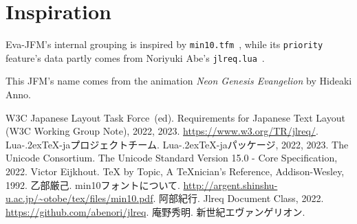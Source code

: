 \documentclass[twoside]{article}
\def\LuaTeX{Lua\kern-.2ex\TeX}
\begin{document}
\section{Inspiration}
\textsf{Eva-JFM}'s internal grouping is inspired by \texttt{min10.tfm}~\cite{min10}, while its \texttt{priority} feature's data partly comes from Noriyuki Abe's \texttt{jlreq.lua}~\cite{ltxjlreq}.\par
This JFM's name comes from the animation \textit{Neon Genesis Evangelion\/} by Hideaki Anno.

\begin{thebibliography}{9}
     W3C Japanese Layout Task Force~(ed). \newblock Requirements for Japanese Text Layout (W3C Working Group Note), 2022, 2023. \newblock \url{https://www.w3.org/TR/jlreq/}.
     \LuaTeX-jaプロジェクトチーム. \newblock \LuaTeX-jaパッケージ, 2022, 2023.
     The Unicode Consortium. \newblock The Unicode Standard Version 15.0 - Core Specification, 2022.
     Victor Eijkhout. \newblock \TeX{} by Topic, A \TeX nician's Reference, Addison-Wesley, 1992.
     乙部厳己. \newblock min10フォントについて. \newblock \url{http://argent.shinshu-u.ac.jp/~otobe/tex/files/min10.pdf}.
     阿部紀行. \newblock Jlreq Document Class, 2022. \newblock \url{https://github.com/abenori/jlreq}.
     庵野秀明. \newblock 新世紀エヴァンゲリオン.
\end{thebibliography}
\end{document}
